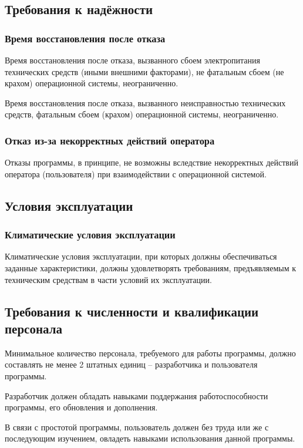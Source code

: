 \documentclass[14pt]{extarticle}
\begin{document}
\subsection{Требования к надёжности}  
\subsubsection{Время восстановления после отказа}
Время восстановления после отказа, вызванного сбоем электропитания технических средств (иными внешними факторами), не фатальным сбоем (не крахом) операционной системы, неограниченно. 
\par Время восстановления после отказа, вызванного неисправностью технических средств, фатальным сбоем (крахом) операционной системы, неограниченно.

\subsubsection {Отказ из-за некорректных действий оператора}   
Отказы программы, в принципе, не возможны вследствие некорректных действий оператора (пользователя) при взаимодействии с операционной системой. 

\subsection {Условия эксплуатации}
\subsubsection {Климатические условия эксплуатации}
Климатические условия эксплуатации, при которых должны обеспечиваться заданные характеристики, должны удовлетворять требованиям, предъявляемым к техническим средствам в части условий их эксплуатации.

\subsection {Требования к численности и квалификации персонала}
Минимальное количество персонала, требуемого для работы программы, должно составлять не менее 2 штатных единиц – разработчика и пользователя программы.
\par Разработчик должен обладать навыками поддержания работоспособности программы, его обновления и дополнения.
\par В связи с простотой программы, пользователь должен без труда или же с последующим изучением, овладеть навыками использования данной программы.
\end{document}
